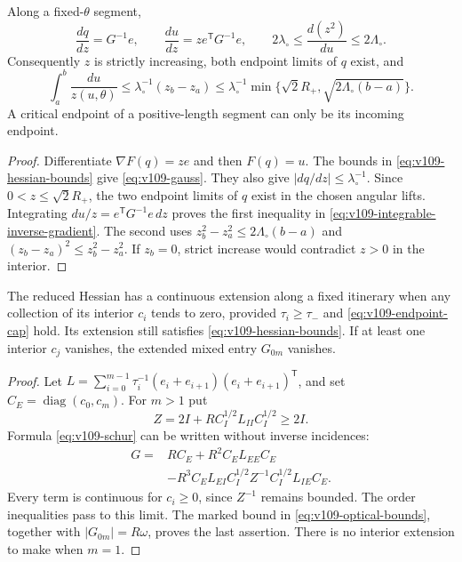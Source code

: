 \begin{lemma}
\label{lem:v109-gauss}
Along a fixed-$\theta$ segment,
\begin{equation}\label{eq:v109-gauss}
 \frac{dq}{dz}=G^{-1}e,\qquad
 \frac{du}{dz}=z e^{\mathsf T}G^{-1}e,\qquad
 2\lambda_\circ\leq\frac{d(z^2)}{du}\leq2\Lambda_\circ.
\end{equation}
Consequently $z$ is strictly increasing, both endpoint limits of
$q$ exist, and
\begin{equation}\label{eq:v109-integrable-inverse-gradient}
 \int_a^b\frac{du}{z(u,\theta)}
 \leq\lambda_\circ^{-1}(z_b-z_a)
 \leq\lambda_\circ^{-1}\min\{\sqrt2 R_+,
                                      \sqrt{2\Lambda_\circ(b-a)}\}.
\end{equation}
A critical endpoint of a positive-length segment can only be its
incoming endpoint.
\end{lemma}
\begin{proof}
Differentiate $\nabla F(q)=z e$ and then $F(q)=u$.
The bounds in \eqref{eq:v109-hessian-bounds} give
\eqref{eq:v109-gauss}. They also give $|dq/dz|\leq\lambda_\circ^{-1}$.
Since $0<z\leq\sqrt2 R_+$, the two endpoint limits of $q$ exist
in the chosen angular lifts. Integrating $du/z=e^{\mathsf T}G^{-1}e\,dz$
proves the first inequality in \eqref{eq:v109-integrable-inverse-gradient}.
The second uses $z_b^2-z_a^2\leq2\Lambda_\circ(b-a)$ and
$(z_b-z_a)^2\leq z_b^2-z_a^2$.
If $z_b=0$, strict increase would contradict $z>0$ in the interior.
\end{proof}

\begin{lemma}
\label{lem:v109-continuous-schur}
The reduced Hessian has a continuous extension along a fixed
itinerary when any collection of its interior $c_i$ tends to zero,
provided $\tau_i\geq\tau_-$ and \eqref{eq:v109-endpoint-cap} hold.
Its extension still satisfies \eqref{eq:v109-hessian-bounds}.
If at least one interior $c_j$ vanishes, the extended mixed entry
$G_{0m}$ vanishes.
\end{lemma}
\begin{proof}
Let $L=\sum_{i=0}^{m-1}\tau_i^{-1}
(e_i+e_{i+1})(e_i+e_{i+1})^{\mathsf T}$, and set
$C_E=\operatorname{diag}(c_0,c_m)$.
For $m>1$ put
\[
 Z=2I+R C_I^{1/2}L_{II}C_I^{1/2}\geq2I.
\]
Formula \eqref{eq:v109-schur} can be written without inverse incidences:
\begin{equation}\label{eq:v109-continuous-schur}
 \begin{split}
 G={}&RC_E+R^2 C_E L_{EE}C_E\\
 &-R^3 C_E L_{EI}C_I^{1/2}Z^{-1}
                      C_I^{1/2}L_{IE}C_E.
 \end{split}
\end{equation}
Every term is continuous for $c_i\geq0$, since $Z^{-1}$ remains
bounded. The order inequalities pass to this limit. The marked
bound in \eqref{eq:v109-optical-bounds}, together with
$|G_{0m}|=R\omega$, proves the last assertion. There is no interior
extension to make when $m=1$.
\end{proof}

